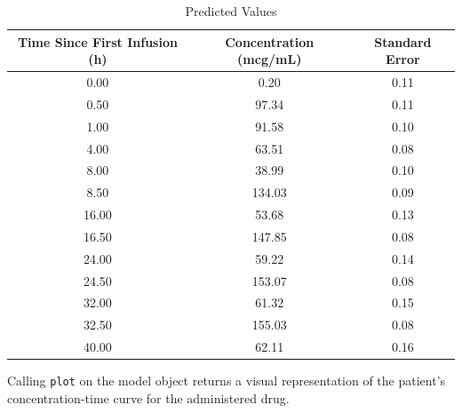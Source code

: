 \documentclass{article}\usepackage[]{graphicx}\usepackage[]{color}
\begin{document}
\begin{table}[ht]
\centering
\caption{Predicted Values} 
\begin{tabular}{ccc}
  \hline
Time Since First Infusion (h) & Concentration (mcg/mL) & Standard Error \\ 
  \hline
0.00 & 0.20 & 0.11 \\ 
  0.50 & 97.34 & 0.11 \\ 
  1.00 & 91.58 & 0.10 \\ 
  4.00 & 63.51 & 0.08 \\ 
  8.00 & 38.99 & 0.10 \\ 
  8.50 & 134.03 & 0.09 \\ 
  16.00 & 53.68 & 0.13 \\ 
  16.50 & 147.85 & 0.08 \\ 
  24.00 & 59.22 & 0.14 \\ 
  24.50 & 153.07 & 0.08 \\ 
  32.00 & 61.32 & 0.15 \\ 
  32.50 & 155.03 & 0.08 \\ 
  40.00 & 62.11 & 0.16 \\ 
   \hline
\end{tabular}
\end{table}



Calling \texttt{plot} on the model object returns a visual representation of the patient's concentration-time curve for the administered drug.
\end{document}
